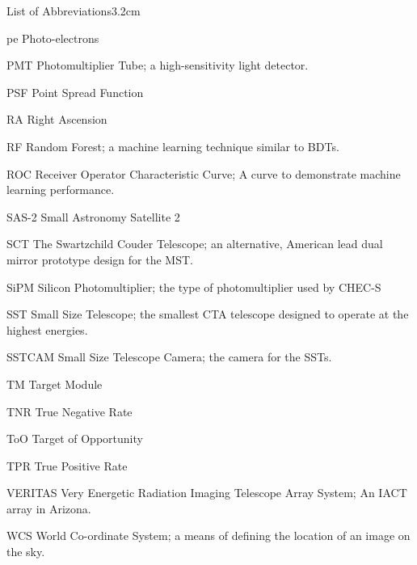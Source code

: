 \begin{mclistof}{List of Abbreviations}{3.2cm}
\item[pe] Photo-electrons
\item[PMT] Photomultiplier Tube; a high-sensitivity light detector.
\item[PSF] Point Spread Function
\item[RA] Right Ascension
\item[RF] Random Forest; a machine learning technique similar to BDTs.
\item[ROC] Receiver Operator Characteristic Curve; A curve to demonstrate machine learning performance. 
\item[SAS-2] Small Astronomy Satellite 2
\item[SCT] The Swartzchild Couder Telescope; an alternative, American lead dual mirror prototype design for the MST.
\item[SiPM] Silicon Photomultiplier; the type of photomultiplier used by CHEC-S
\item[SST] Small Size Telescope; the smallest CTA telescope designed to operate at the highest energies.
\item[SSTCAM] Small Size Telescope Camera; the camera for the SSTs.
\item[TM] Target Module
\item[TNR] True Negative Rate
\item[ToO] Target of Opportunity
\item[TPR] True Positive Rate
\item[VERITAS] Very Energetic Radiation Imaging Telescope Array System; An IACT array in Arizona.
\item[WCS] World Co-ordinate System; a means of defining the location of an image on the sky.
\end{mclistof} 
